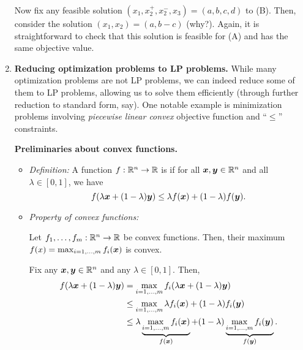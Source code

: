 \begin{enumerate}
\begin{pf}
Now fix any feasible solution \((x_1,x_2^{+},x_2^{-},x_3)=(a,b,c,d)\) to (B).
Then, consider the solution \((x_1,x_2)=(a,b-c)\) (why?).  Again, it is
straightforward to check that this solution is feasible for (A) and has the
same objective value.
\end{pf}
\item\label{it:piecewise-linear-cvx-to-lp} \textbf{Reducing optimization problems to LP problems.}
While many optimization problems are not LP problems, we can indeed reduce some
of them to LP problems, allowing us to solve them efficiently (through further
reduction to standard form, say). One notable example is minimization problems
involving \emph{piecewise linear convex} objective function and ``\(\leq\)''
constraints.

\textbf{Preliminaries about convex functions.}
\begin{itemize}
\item \emph{Definition:} A function \(f:\mathbb{R}^n\to \mathbb{R}\) is  if for
all \(\bm{x},\bm{y}\in\mathbb{R}^n\) and all \(\lambda\in[0,1]\), we have
\[
f(\lambda\bm{x}+(1-\lambda)\bm{y})\le\lambda
f(\bm{x})+(1-\lambda)f(\bm{y}).
\]
\begin{center}
\end{center}
\item \emph{Property of convex functions:}
\begin{proposition}
\label{prp:max-cvx-cvx}
Let \(f_1,\dotsc,f_m:\mathbb{R}^n\to\mathbb{R}\) be convex functions. Then, their
maximum \(f(x)=\max_{i=1,\dotsc,m}f_i(\bm{x})\) is convex.
\end{proposition}
\begin{pf}
Fix any \(\bm{x},\bm{y}\in\mathbb{R}^n\) and any \(\lambda\in[0,1]\). Then,
\begin{align*}
f(\lambda\bm{x}+(1-\lambda)\bm{y})
&=\max_{i=1,\dotsc,m}f_i(\lambda\bm{x}+(1-\lambda)\bm{y}) \\
&\le\max_{i=1,\dotsc,m}\lambda f_i(\bm{x})+(1-\lambda)f_i(\bm{y}) \\
&\le \lambda \underbrace{\max_{i=1,\dotsc,m}f_i(\bm{x})}_{f(\bm{x})}
+(1-\lambda)\underbrace{\max_{i=1,\dotsc,m}f_i(\bm{y})}_{f(\bm{y})}.
\end{align*}
\end{pf}
\end{itemize}


\end{enumerate}
